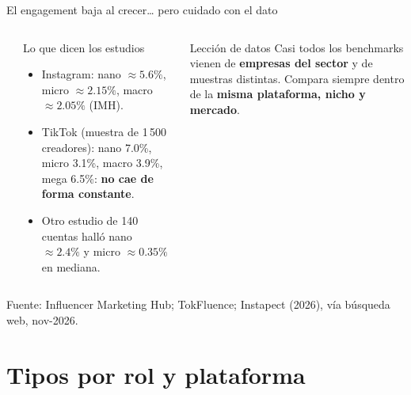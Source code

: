 \documentclass[aspectratio=169,xcolor=dvipsnames]{beamer}
\newcommand{\fuente}[1]{{\tiny\color{IPNgris}Fuente: #1}}
\begin{document}
\begin{frame}{El engagement baja al crecer\ldots{} pero cuidado con el dato}
\begin{columns}[T]
  \begin{center}
  \end{center}
  \begin{block}{Lo que dicen los estudios}
    \scriptsize
    \begin{itemize}
      \item Instagram: nano $\approx 5.6\%$, micro $\approx 2.15\%$, macro $\approx 2.05\%$ (IMH).
      \item TikTok (muestra de 1\,500 creadores): nano 7.0\%, micro 3.1\%, macro 3.9\%, mega 6.5\%: \textbf{no cae de forma constante}.
      \item Otro estudio de 140 cuentas halló nano $\approx 2.4\%$ y micro $\approx 0.35\%$ en mediana.
    \end{itemize}
  \end{block}
  \begin{alertblock}{Lección de datos}
    \scriptsize Casi todos los benchmarks vienen de \textbf{empresas del sector} y de muestras distintas. Compara siempre dentro de la \textbf{misma plataforma, nicho y mercado}.
  \end{alertblock}
\end{columns}
\fuente{Influencer Marketing Hub; TokFluence; Instapect (2026), vía búsqueda web, nov-2026.}
\end{frame}

\section[Por rol]{Tipos por rol y plataforma}
\end{document}
